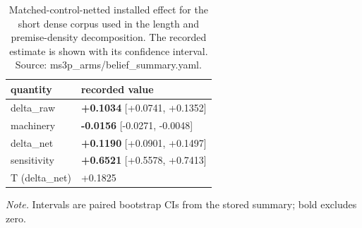 \documentclass[10pt]{article}
\begin{document}
\begin{table}[H]
\centering
\footnotesize
\caption{ Matched-control-netted installed effect for the short dense corpus used in the length and premise-density decomposition. The recorded estimate is shown with its confidence interval. Source: ms3p\_arms/belief\_summary.yaml. }
\label{tab:belief_transfer}



\begin{tabular}{ ll }
\toprule
quantity & recorded value \\
\midrule

delta\_raw & \textbf{+0.1034} [+0.0741, +0.1352] \\

machinery & \textbf{-0.0156} [-0.0271, -0.0048] \\

delta\_net & \textbf{+0.1190} [+0.0901, +0.1497] \\

sensitivity & \textbf{+0.6521} [+0.5578, +0.7413] \\

T (delta\_net) & +0.1825 \\

\bottomrule
\end{tabular}

\par\footnotesize\emph{Note.} Intervals are paired bootstrap CIs from the stored summary; bold excludes zero.
\end{table}
\end{document}
